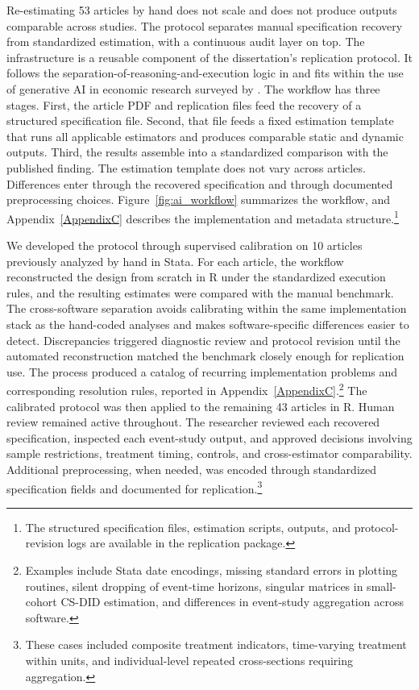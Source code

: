 Re-estimating 53 articles by hand does not scale and does not produce outputs comparable across studies. The protocol separates manual specification recovery from standardized estimation, with a continuous audit layer on top. The infrastructure is a reusable component of the dissertation's replication protocol. It follows the separation-of-reasoning-and-execution logic in \textcite{xu2026scaling} and fits within the use of generative AI in economic research surveyed by \textcite{korinek2023generative}. The workflow has three stages. First, the article PDF and replication files feed the recovery of a structured specification file. Second, that file feeds a fixed estimation template that runs all applicable estimators and produces comparable static and dynamic outputs. Third, the results assemble into a standardized comparison with the published finding. The estimation template does not vary across articles. Differences enter through the recovered specification and through documented preprocessing choices. Figure~\ref{fig:ai_workflow} summarizes the workflow, and Appendix~\ref{AppendixC} describes the implementation and metadata structure.\footnote{The structured specification files, estimation scripts, outputs, and protocol-revision logs are available in the replication package.}


We developed the protocol through supervised calibration on 10 articles previously analyzed by hand in Stata. For each article, the workflow reconstructed the design from scratch in R under the standardized execution rules, and the resulting estimates were compared with the manual benchmark. The cross-software separation avoids calibrating within the same implementation stack as the hand-coded analyses and makes software-specific differences easier to detect. Discrepancies triggered diagnostic review and protocol revision until the automated reconstruction matched the benchmark closely enough for replication use. The process produced a catalog of recurring implementation problems and corresponding resolution rules, reported in Appendix~\ref{AppendixC}.\footnote{Examples include Stata date encodings, missing standard errors in plotting routines, silent dropping of event-time horizons, singular matrices in small-cohort CS-DID estimation, and differences in event-study aggregation across software.} The calibrated protocol was then applied to the remaining 43 articles in R. Human review remained active throughout. The researcher reviewed each recovered specification, inspected each event-study output, and approved decisions involving sample restrictions, treatment timing, controls, and cross-estimator comparability. Additional preprocessing, when needed, was encoded through standardized specification fields and documented for replication.\footnote{These cases included composite treatment indicators, time-varying treatment within units, and individual-level repeated cross-sections requiring aggregation.}

